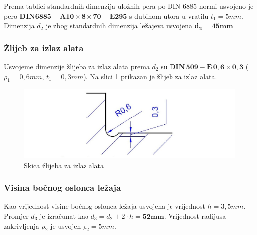 \documentclass[11pt,a4paper]{article}
\begin{document}
Prema tablici standardnih dimenzija uložnih pera po DIN 6885 normi usvojeno je pero 
$\mathbf{DIN6885-A 10 \times 8 \times 70-E295}$ s dubinom utora u vratilu $t_1=5mm$.
Dimenzija $d_2$ je zbog standardnih dimenzija ležajeva usvojena $\mathbf{d_2=45mm}$
\subsubsection*{Žlijeb za izlaz alata}
Usvojeme dimenzije žlijeba za izlaz alata prema $d_2$ su $\mathbf{DIN \, 509-E \, 0,6 \times 0,3}$ ($\rho_1=0,6mm$, $t_1=0,3mm$). Na slici \ref{izlazAlata} prikazan je žlijeb za izlaz alata.
\begin{figure}[H]
\centering
\includegraphics[width=1\textwidth]{izlazAlata}
\caption{Skica žlijeba za izlaz alata}\label{izlazAlata}
\end{figure}
\subsubsection*{Visina bočnog oslonca ležaja}
Kao vrijednost visine bočnog oslonca ležaja usvojena je vrijednost $h=3,5mm$.
Promjer $d_3$ je izračunat kao $d_3=d_2+2 \cdot h = \mathbf{52mm}$.
Vrijednost radijusa zakrivljenja $\rho_2$ je usvojen $\rho_2=5mm$.
\end{document}
